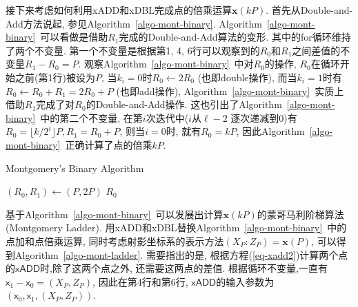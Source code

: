 
接下来考虑如何利用\textsf{xADD}和\textsf{xDBL}完成点的倍乘运算$\mathbf{x}(kP)$.
首先从Double-and-Add方法说起, 参见Algorithm~\ref{algo-mont-binary}. 
Algorithm~\ref{algo-mont-binary}~可以看做是借助$R_1$完成的Double-and-Add算法的变形.
其中的\textsf{for}循环维持了两个不变量. 
第一个不变量是根据第1, 4, 6行可以观察到的$R_0$和$R_1$之间差值的不变量$R_1-R_0 = P$.
观察Algorithm~\ref{algo-mont-binary}~中对$R_0$的操作, $R_0$在循环开始之前(第1行)被设为$P$,
当$k_i=0$时$R_0\leftarrow 2R_0$ (也即double操作), 
而当$k_i=1$时有$R_0\leftarrow R_0 + R_1 = 2R_0 + P$ (也即add操作),
Algorithm~\ref{algo-mont-binary}~实质上借助$R_1$完成了对$R_0$的Double-and-Add操作.
这也引出了Algorithm~\ref{algo-mont-binary}~中的第二个不变量, 在第$i$次迭代中($i$从$\ell-2$
逐次递减到0)有$R_0 = \lfloor k/2^i \rfloor P, R_1 = R_0 + P$, 则当$i = 0$时, 就有$R_0 = kP$,
因此Algorithm~\ref{algo-mont-binary}~正确计算了点的倍乘$kP$.

\begin{algorithm}[h]
\caption{Montgomery's Binary Algorithm}%
\label{algo-mont-binary}
\LinesNumbered %
$(R_0, R_1)  \leftarrow (P, 2P)$\; %
\Return $R_0$
\end{algorithm}

基于Algorithm~\ref{algo-mont-binary}~可以发展出计算$\mathbf{x}(kP)$的蒙哥马利阶梯算法(Montgomery Ladder).
用\textsf{xADD}和\textsf{xDBL}替换Algorithm~\ref{algo-mont-binary}~中的点加和点倍乘运算,
同时考虑射影坐标系的表示方法$(X_P:Z_P) = \mathbf{x}(P)$, 可以得到Algorithm~\ref{algo-mont-ladder}.
需要指出的是, 根据方程(\ref{eq-xadd2})计算两个点的$\textsf{xADD}$时,除了这两个点之外,
还需要这两点的差值. 根据循环不变量,一直有$\textsf{x}_1 - \textsf{x}_0 = (X_P, Z_P)$, 
因此在第4行和第6行, $\textsf{xADD}$的输入参数为$(\textsf{x}_0, \textsf{x}_1, (X_P, Z_P))$.

